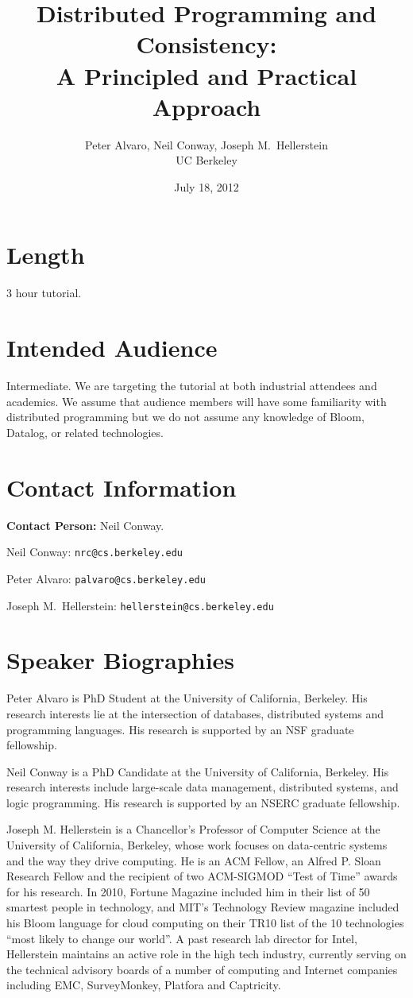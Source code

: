 \documentclass[11pt]{article}
\title{Distributed Programming and Consistency:\\A Principled and Practical Approach}
\author{Peter Alvaro, Neil Conway, Joseph M.\ Hellerstein\\UC Berkeley}
\date{July 18, 2012}
\begin{document}
\maketitle

\section*{Length}

3 hour tutorial.

\section*{Intended Audience}

Intermediate. We are targeting the tutorial at both industrial attendees and
academics. We assume that audience members will have some familiarity with
distributed programming but we do not assume any knowledge of Bloom, Datalog, or
related technologies.

\section*{Contact Information}

\textbf{Contact Person:} Neil Conway.

\bigskip

\noindent{}Neil Conway: \texttt{nrc@cs.berkeley.edu}

\noindent{}Peter Alvaro: \texttt{palvaro@cs.berkeley.edu}

\noindent{}Joseph M.\ Hellerstein: \texttt{hellerstein@cs.berkeley.edu}

\section*{Speaker Biographies}

Peter Alvaro is PhD Student at the University of California, Berkeley. His
research interests lie at the intersection of databases, distributed systems and
programming languages. His research is supported by an NSF graduate fellowship.

Neil Conway is a PhD Candidate at the University of California, Berkeley. His
research interests include large-scale data management, distributed systems,
and logic programming. His research is supported by an NSERC graduate
fellowship.

Joseph M. Hellerstein is a Chancellor's Professor of Computer Science at the
University of California, Berkeley, whose work focuses on data-centric systems
and the way they drive computing. He is an ACM Fellow, an Alfred P. Sloan
Research Fellow and the recipient of two ACM-SIGMOD ``Test of Time'' awards for
his research. In 2010, Fortune Magazine included him in their list of 50
smartest people in technology, and MIT's Technology Review magazine included his
Bloom language for cloud computing on their TR10 list of the 10 technologies
``most likely to change our world''. A past research lab director for Intel,
Hellerstein maintains an active role in the high tech industry, currently
serving on the technical advisory boards of a number of computing and Internet
companies including EMC, SurveyMonkey, Platfora and Captricity.
\end{document}
